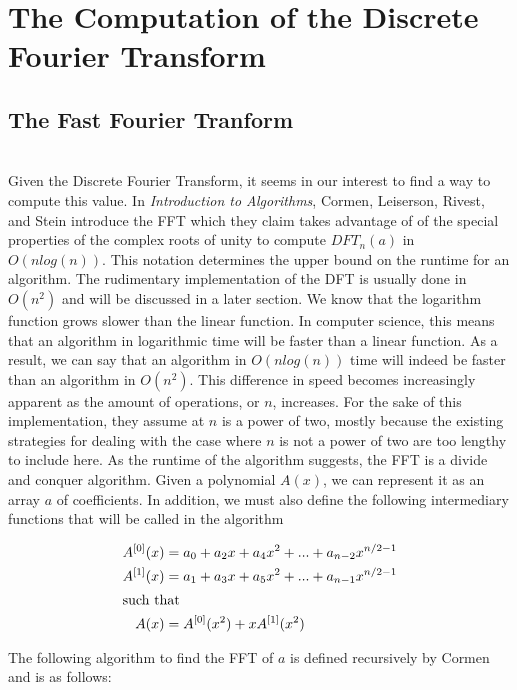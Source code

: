 \documentclass{amsproc}
\begin{document}
\section{The Computation of the Discrete Fourier Transform}

\subsection{The Fast Fourier Tranform}


\mbox{}	 \\
\indent Given the Discrete Fourier Transform, it seems in our interest to find a way to compute this value. In \textit{Introduction to Algorithms}, Cormen, Leiserson, Rivest, and Stein introduce the FFT which they claim takes advantage of of the special properties of the complex roots of unity to compute $DFT_n(a)$ in $O(nlog(n))$. This notation determines the upper bound on the runtime for an algorithm. The rudimentary implementation of the DFT is usually done in $O(n^2)$ and will be discussed in a later section. We know that the logarithm function grows slower than the linear function. In computer science, this means that an algorithm in logarithmic time will be faster than a linear function. As a result, we can say that an algorithm in $O(nlog(n))$ time will indeed be faster than an algorithm in $O(n^2)$. This difference in speed becomes increasingly apparent as the amount of operations, or $n$, increases.  For the sake of this implementation, they assume at $n$ is a power of two, mostly because the existing strategies for dealing with the case where $n$ is not a power of two are too lengthy to include here. As the runtime of the algorithm suggests, the FFT is a divide and conquer algorithm. Given a polynomial $A(x)$, we can represent it as an array $a$ of coefficients. In addition, we must also define the following intermediary functions that will be called in the algorithm \cite{Cormen}
	
\begin{align*}
A^{[0]}(x) &= a_0 + a_2x + a_4x^2 + ... + a_{n-2}x^{n/2 - 1} \\
A^{[1]}(x) &= a_1 + a_3x + a_5x^2 + ... + a_{n-1}x^{n/2 - 1} \\
\intertext{such that}
A(x) &= A^{[0]}(x^2) + xA^{[1]}(x^2)
\end{align*}

The following algorithm to find the FFT of $a$ is defined recursively by Cormen and is as follows:
\end{document}
